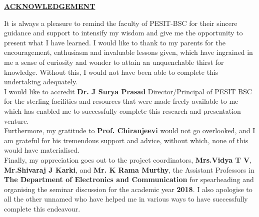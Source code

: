 \documentclass[12pt,a4paper]{report}
\begin{document}

\begin{center}\underline{ \Large\textbf{ACKNOWLEDGEMENT}}\end{center}
It is always a pleasure to remind the faculty of PESIT-BSC for their sincere guidance and support to intensify my wisdom and give me the opportunity to present what I have learned. I would like to thank to my parents for the encouragement, enthusiasm and invaluable lessons given, which have ingrained in me a sense of curiosity and wonder to attain an unquenchable thirst for knowledge. Without this, I would not have been able to complete this undertaking adequately.\\

I would like to accredit \textbf{Dr. J Surya Prasad} Director/Principal of PESIT BSC for the sterling facilities and resources that were made freely available to me which has enabled me to successfully complete this research and presentation venture.\\

Furthermore, my gratitude to \textbf{Prof. Chiranjeevi} would not go overlooked, and I am grateful for his tremendous support and advice, without which, none of this would have materialised.\\

Finally, my appreciation goes out to the project coordinators, \textbf{ Mrs.Vidya T V},\textbf{ Mr.Shivaraj J Karki}, and \textbf{ Mr. K Rama Murthy}, the Assistant Professors in \textbf{The Department of Electronics and Communication} for spearheading and organising the seminar discussion for the academic year  \textbf{2018}.
I also apologise to all the other unnamed who have helped me in various ways to have successfully complete this endeavour.
\end{document}
